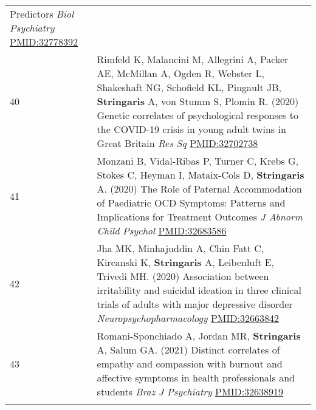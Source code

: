 \documentclass[
]{article}
\begin{document}
\begin{longtable}[]{@{}ll@{}}
\begin{minipage}[t]{0.94\columnwidth}
Predictors \emph{Biol Psychiatry} \url{PMID:32778392}\strut
\end{minipage}\tabularnewline
\begin{minipage}[t]{0.01\columnwidth}\raggedright
40\strut
\end{minipage} & \begin{minipage}[t]{0.94\columnwidth}\raggedright
Rimfeld K, Malancini M, Allegrini A, Packer AE, McMillan A, Ogden R,
Webster L, Shakeshaft NG, Schofield KL, Pingault JB, \textbf{Stringaris}
A, von Stumm S, Plomin R. (2020) Genetic correlates of psychological
responses to the COVID-19 crisis in young adult twins in Great Britain
\emph{Res Sq} \url{PMID:32702738}\strut
\end{minipage}\tabularnewline
\begin{minipage}[t]{0.01\columnwidth}\raggedright
41\strut
\end{minipage} & \begin{minipage}[t]{0.94\columnwidth}\raggedright
Monzani B, Vidal-Ribas P, Turner C, Krebs G, Stokes C, Heyman I,
Mataix-Cols D, \textbf{Stringaris} A. (2020) The Role of Paternal
Accommodation of Paediatric OCD Symptoms: Patterns and Implications for
Treatment Outcomes \emph{J Abnorm Child Psychol}
\url{PMID:32683586}\strut
\end{minipage}\tabularnewline
\begin{minipage}[t]{0.01\columnwidth}\raggedright
42\strut
\end{minipage} & \begin{minipage}[t]{0.94\columnwidth}\raggedright
Jha MK, Minhajuddin A, Chin Fatt C, Kircanski K, \textbf{Stringaris} A,
Leibenluft E, Trivedi MH. (2020) Association between irritability and
suicidal ideation in three clinical trials of adults with major
depressive disorder \emph{Neuropsychopharmacology}
\url{PMID:32663842}\strut
\end{minipage}\tabularnewline
\begin{minipage}[t]{0.01\columnwidth}\raggedright
43\strut
\end{minipage} & \begin{minipage}[t]{0.94\columnwidth}\raggedright
Romani-Sponchiado A, Jordan MR, \textbf{Stringaris} A, Salum GA. (2021)
Distinct correlates of empathy and compassion with burnout and affective
symptoms in health professionals and students \emph{Braz J Psychiatry}
\url{PMID:32638919}\strut
\end{minipage}\tabularnewline
\begin{minipage}[t]{0.01\columnwidth}\raggedright

\end{minipage}
\end{longtable}
\end{document}
